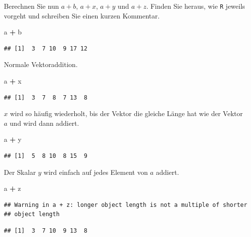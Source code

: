 \documentclass[12pt,a4paper]{article}
\newenvironment{Shaded}{\begin{snugshade}}{\end{snugshade}}
\newcommand{\NormalTok}[1]{#1}
\newcommand{\SpecialCharTok}[1]{\textcolor[rgb]{0.81,0.36,0.00}{\textbf{#1}}}
\begin{document}
Berechnen Sie nun \(a+b\), \(a+x\), \(a+y\) und \(a+z\). Finden Sie
heraus, wie \texttt{R} jeweils vorgeht und schreiben Sie einen kurzen
Kommentar.

\begin{Shaded}
\begin{Highlighting}[]
\NormalTok{    a }\SpecialCharTok{+}\NormalTok{ b }
\end{Highlighting}
\end{Shaded}

\begin{verbatim}
## [1]  3  7 10  9 17 12
\end{verbatim}

Normale Vektoraddition.

\begin{Shaded}
\begin{Highlighting}[]
\NormalTok{    a }\SpecialCharTok{+}\NormalTok{ x}
\end{Highlighting}
\end{Shaded}

\begin{verbatim}
## [1]  3  7  8  7 13  8
\end{verbatim}

\(x\) wird so häufig wiederholt, bis der Vektor die gleiche Länge hat
wie der Vektor \(a\) und wird dann addiert.

\begin{Shaded}
\begin{Highlighting}[]
\NormalTok{    a }\SpecialCharTok{+}\NormalTok{ y}
\end{Highlighting}
\end{Shaded}

\begin{verbatim}
## [1]  5  8 10  8 15  9
\end{verbatim}

Der Skalar \(y\) wird einfach auf jedes Element von \(a\) addiert.

\begin{Shaded}
\begin{Highlighting}[]
\NormalTok{    a }\SpecialCharTok{+}\NormalTok{ z}
\end{Highlighting}
\end{Shaded}

\begin{verbatim}
## Warning in a + z: longer object length is not a multiple of shorter
## object length
\end{verbatim}

\begin{verbatim}
## [1]  3  7 10  9 13  8
\end{verbatim}
\end{document}
